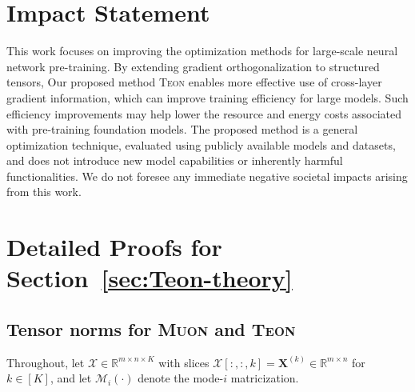 \documentclass{article}
\newcommand{\ten}[1]{\bm{\mathcal{#1}}}
\newcommand{\mat}[1]{\mathbf{#1}}
\theoremstyle{plain}
\theoremstyle{definition}
\theoremstyle{remark}
\begin{document}
\clearpage
\section*{Impact Statement}

This work focuses on improving the optimization methods for large-scale neural network pre-training. By extending gradient orthogonalization to structured tensors, Our proposed method \textsc{Teon} enables more effective use of cross-layer gradient information, which can improve training efficiency for large models. Such efficiency improvements may help lower the resource and energy costs associated with pre-training foundation models. The proposed method is a general optimization technique, evaluated using publicly available models and datasets, and does not introduce new model capabilities or inherently harmful functionalities. We do not foresee any immediate negative societal impacts arising from this work.





\newpage
\appendix
\onecolumn



\section{Detailed Proofs for Section~\ref{sec:Teon-theory}}


\subsection{Tensor norms for \textsc{Muon} and \textsc{Teon}}
\label{app:norms}

Throughout, let $\ten{X}\in\mathbb{R}^{m\times n\times K}$ with slices
$\ten{X}[:,:, k]=\mat{X}^{(k)}\in\mathbb{R}^{m\times n}$ for $k\in[K]$, and let
$\mathcal{M}_i(\cdot)$ denote the mode-$i$ matricization.
\end{document}
